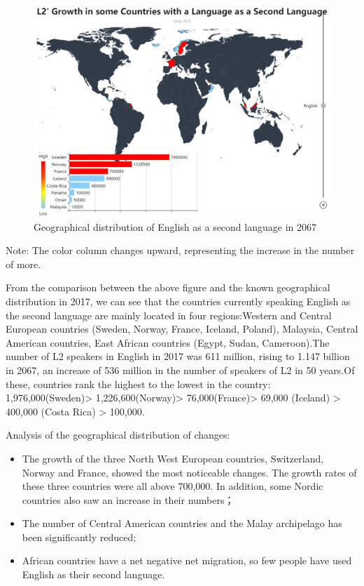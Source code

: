 \begin{figure}[H]
	\centering
	\includegraphics[width=1\linewidth]{figures/english}
	\caption{Geographical distribution of English as a second language in 2067}
	\label{fig:english}
\end{figure}

\noindent Note: The color column changes upward, representing the increase in the number of more.\\
\par From the comparison between the above figure and the known geographical distribution in 2017, we can see that the countries currently speaking English as the second language are mainly located in four regions:Western and Central European countries (Sweden, Norway, France, Iceland, Poland), Malaysia, Central American countries, East African countries (Egypt, Sudan, Cameroon).The number of L2 speakers in English in 2017 was 611 million, rising to 1.147 billion in 2067, an increase of 536 million in the number of speakers of L2 in 50 years.Of these, countries rank the highest to the lowest in the country: 1,976,000(Sweden)> 1,226,600(Norway)> 76,000(France)> 69,000 (Iceland) > 400,000 (Costa Rica) > 100,000.
\par Analysis of the geographical distribution of changes:
\begin{itemize}
	\item The growth of the three North West European countries, Switzerland, Norway and France, showed the most noticeable changes. The growth rates of these three countries were all above 700,000. In addition, some Nordic countries also saw an increase in their numbers；
	\item The number of Central American countries and the Malay archipelago has been significantly reduced;
	\item African countries have a net negative net migration, so few people have used English as their second language. 
\end{itemize} 

